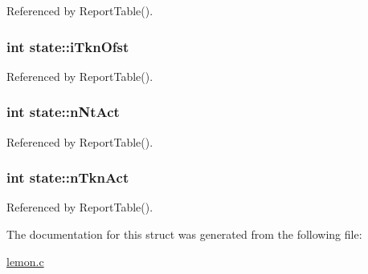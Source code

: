 Referenced by Report\-Table().

\hypertarget{structstate_a8b8000826bd6bdea4863293f586efc1b}{
\subsubsection[{i\-Tkn\-Ofst}]{\setlength{\rightskip}{0pt plus 5cm}int state\-::i\-Tkn\-Ofst}}\label{structstate_a8b8000826bd6bdea4863293f586efc1b}


Referenced by Report\-Table().

\hypertarget{structstate_a1e83b06b14c77fff6ca0cd1439991a3a}{
\subsubsection[{n\-Nt\-Act}]{\setlength{\rightskip}{0pt plus 5cm}int state\-::n\-Nt\-Act}}\label{structstate_a1e83b06b14c77fff6ca0cd1439991a3a}


Referenced by Report\-Table().

\hypertarget{structstate_a2f282b0c7be7363f1e6b516fc04ec3df}{
\subsubsection[{n\-Tkn\-Act}]{\setlength{\rightskip}{0pt plus 5cm}int state\-::n\-Tkn\-Act}}\label{structstate_a2f282b0c7be7363f1e6b516fc04ec3df}


Referenced by Report\-Table().



The documentation for this struct was generated from the following file\-:\begin{DoxyCompactItemize}
\item 
\hyperlink{lemon_8c}{lemon.\-c}\end{DoxyCompactItemize}

